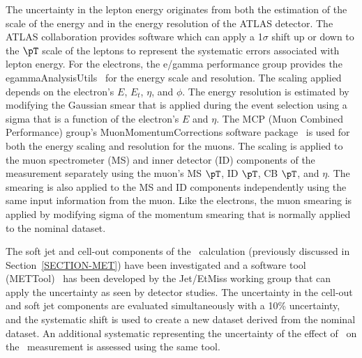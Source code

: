 The uncertainty in the lepton energy originates from both the estimation of the scale of the energy and in the energy resolution of the ATLAS detector. The ATLAS collaboration provides software which can apply a 1$\sigma$ shift up or down to the $\pT$ scale of the leptons to represent the systematic errors associated with lepton energy. For the electrons, the e/gamma performance group provides the {\sc egammaAnalysisUtils}~\cite{ELECTRONENERGYSYSTEMATICS} for the energy scale and resolution. The scaling applied depends on the electron's $E$, $E_t$, $\eta$, and $\phi$. The energy resolution is estimated by modifying the Gaussian smear that is applied during the event selection using a sigma that is a function of the electron's $E$ and $\eta$. The MCP (Muon Combined Performance) group's {\sc MuonMomentumCorrections} software package~\cite{MUONENERGYSYSTEMATICS} is used for both the energy scaling and resolution for the muons. The scaling is applied to the muon spectrometer (MS) and inner detector (ID) components of the measurement separately using the muon's MS $\pT$, ID $\pT$, CB $\pT$, and $\eta$. The smearing is also applied to the MS and ID components independently using the same input information from the muon. Like the electrons, the muon smearing is applied by modifying sigma of the momentum smearing that is normally applied to the nominal dataset. \\

{}

The soft jet and cell-out components of the \MET\ calculation (previously discussed in Section~\ref{SECTION-MET}) have been investigated and a software tool ({\sc METTool})~\cite{TOPMET} has been developed by the Jet/EtMiss working group that can apply the uncertainty as seen by detector studies. The uncertainty in the cell-out and soft jet components are evaluated simultaneously with a 10\% uncertainty, and the systematic shift is used to create a new dataset derived from the nominal dataset. An additional systematic representing the uncertainty of the effect of \pileup\ on the \MET\ measurement is assessed using the same tool.\\

%

